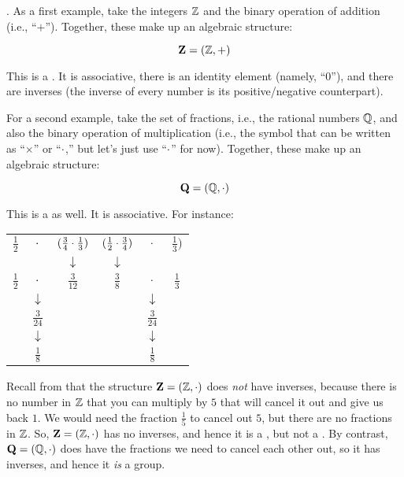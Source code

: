 \documentclass[../../../main.tex]{subfiles}
\begin{document}
. As a first example, take the integers $\Ints/$ and the binary operation of addition (i.e., ``$+$''). Together, these make up an algebraic structure:

\begin{equation*}
  \algebra{Z} = (\Ints/, +)
\end{equation*} 

This is a . It is associative, there is an identity element (namely, ``$0$''), and there are inverses (the inverse of every number is its positive/negative counterpart).

For a second example, take the set of fractions, i.e., the rational numbers $\Rationals/$, and also the binary operation of multiplication (i.e., the symbol that can be written as ``$\times$'' or ``$\mult/$,'' but let's just use ``$\mult/$'' for now). Together, these make up an algebraic structure:

\begin{equation*}
  \algebra{Q} = (\Rationals/, \mult/)
\end{equation*} 

This is a  as well. It is associative. For instance:

\begin{center}
  \begin{tabular}{c c c | c c c}
    $\frac{1}{2}$ & $\mult/$ & $(\frac{3}{4} \mult/ \frac{1}{3})$ & $(\frac{1}{2} \mult/ \frac{3}{4})$ & $\mult/$ & $\frac{1}{3})$ \\
     & & $\downarrow$ & $\downarrow$ & & \\
     $\frac{1}{2}$ & $\mult/$ & $\frac{3}{12}$ & $\frac{3}{8}$ & $\mult/$ & $\frac{1}{3}$ \\
     & $\downarrow$ & & & $\downarrow$ & \\
     & $\frac{3}{24}$ & & & $\frac{3}{24}$ & \\
     & $\downarrow$ & & & $\downarrow$ & \\
     & $\frac{1}{8}$ & & & $\frac{1}{8}$ &
  \end{tabular}
\end{center}

\begin{aside}
  \begin{remark}
    Recall from  that the structure $\algebra{Z} = (\Ints/, \mult/)$ does \emph{not} have inverses, because there is no number in $\Ints/$ that you can multiply by $5$ that will cancel it out and give us back $1$. We would need the fraction $\frac{1}{5}$ to cancel out $5$, but there are no fractions in $\Ints/$. So, $\algebra{Z} = (\Ints/, \mult/)$ has no inverses, and hence it is a , but not a . By contrast, $\algebra{Q} = (\Rationals/, \mult/)$ does have the fractions we need to cancel each other out, so it has inverses, and hence it \emph{is} a group.
  \end{remark}
\end{aside}
\end{document}
